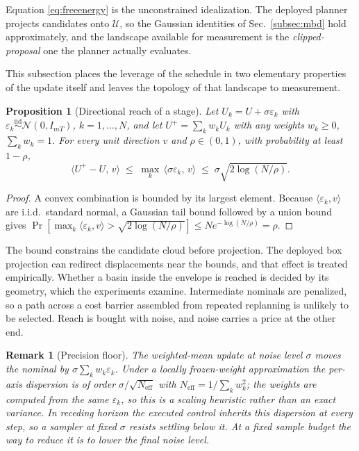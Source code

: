 \documentclass[letterpaper,10pt,conference]{ieeeconf}
\newtheorem{proposition}{Proposition}
\newtheorem{remark}{Remark}
\begin{document}
Equation \eqref{eq:freeenergy} is the unconstrained idealization.
The deployed planner projects candidates onto $\mathcal{U}$, so the Gaussian identities of Sec.~\ref{subsec:mbd} hold approximately, and the landscape available for measurement is the \emph{clipped-proposal} one the planner actually evaluates.

This subsection places the leverage of the schedule in two elementary properties of the update itself and leaves the topology of that landscape to measurement.

\begin{proposition}[Directional reach of a stage]\label{prop:reach}
Let $U_k = U + \sigma \varepsilon_k$ with $\varepsilon_k \overset{\mathrm{iid}}{\sim} \mathcal{N}(0, I_{mT})$, $k = 1, \dots, N$, and let $U^{+} = \sum_k w_k U_k$ with any weights $w_k \ge 0$, $\sum_k w_k = 1$.
For every unit direction $v$ and $\rho \in (0, 1)$, with probability at least $1 - \rho$,
\begin{equation}
\big\langle U^{+} - U,\, v \big\rangle
\;\le\; \max_k\, \big\langle \sigma \varepsilon_k,\, v \big\rangle
\;\le\; \sigma \sqrt{2 \log (N/\rho)} .
\label{eq:reach}
\end{equation}
\end{proposition}
\begin{proof}
A convex combination is bounded by its largest element. Because $\langle \varepsilon_k,v\rangle$ are i.i.d.\ standard normal, a Gaussian tail bound followed by a union bound gives $\Pr[\max_k \langle \varepsilon_k,v\rangle > \sqrt{2\log(N/\rho)}] \le N e^{-\log(N/\rho)}=\rho$.
\end{proof}

The bound constrains the candidate cloud before projection.
The deployed box projection can redirect displacements near the bounds, and that effect is treated empirically.
Whether a basin inside the envelope is reached is decided by its geometry, which the experiments examine.
Intermediate nominals are penalized, so a path across a cost barrier assembled from repeated replanning is unlikely to be selected.
Reach is bought with noise, and noise carries a price at the other end.

\begin{remark}[Precision floor]\label{rem:floor}
The weighted-mean update at noise level $\sigma$ moves the nominal by $\sigma \sum_k w_k \varepsilon_k$.
Under a locally frozen-weight approximation the per-axis dispersion is of order $\sigma / \sqrt{N_{\mathrm{eff}}}$ with $N_{\mathrm{eff}} = 1 / \sum_k w_k^{2}$; the weights are computed from the same $\varepsilon_k$, so this is a scaling heuristic rather than an exact variance.
In receding horizon the executed control inherits this dispersion at every step, so a sampler at fixed $\sigma$ resists settling below it.
At a fixed sample budget the way to reduce it is to lower the final noise level.
\end{remark}
\end{document}
